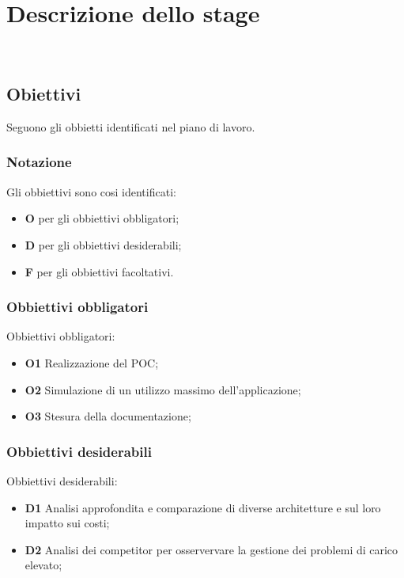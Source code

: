 \chapter{Descrizione dello stage}
\\
\label{cap:descrizione-stage}
\section{Obiettivi}
\label{sec:obiettivi}
Seguono gli obbietti identificati nel piano di lavoro.

\subsection{Notazione}
\label{subsec:notazione}
Gli obbiettivi sono cosi identificati:

\begin{itemize}
    \item \textbf{O} per gli obbiettivi obbligatori;
    \item \textbf{D} per gli obbiettivi desiderabili;
    \item \textbf{F} per gli obbiettivi facoltativi.
\end{itemize}

\subsection{Obbiettivi obbligatori}
Obbiettivi obbligatori:

\begin{itemize}
    \item \textbf{O1} Realizzazione del POC;
    \item \textbf{O2} Simulazione di un utilizzo massimo dell'applicazione;
    \item \textbf{O3} Stesura della documentazione;

\end{itemize}
\subsection{Obbiettivi desiderabili}
Obbiettivi desiderabili:
\begin{itemize}
    \item \textbf{D1} Analisi approfondita e comparazione di diverse architetture e sul loro impatto sui costi;
    \item \textbf{D2} Analisi dei competitor per osservervare la gestione dei problemi di carico elevato;

\end{itemize}
